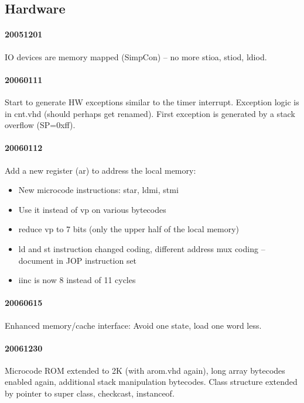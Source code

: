 \documentclass[a4paper,12pt]{scrartcl}
\newcommand{\code}[1]{{\textsf{#1}}}
\begin{document}
\subsection{Hardware}


\paragraph{20051201}

IO devices are memory mapped (SimpCon) -- no more stioa, stiod,
ldiod.


\paragraph{20060111}

Start to generate HW exceptions similar to the timer interrupt.
Exception logic is in \code{cnt.vhd} (should perhaps get renamed).
First exception is generated by a stack overflow (SP=0xff).

\paragraph{20060112}

Add a new register (\code{ar}) to address the local memory:

\begin{itemize}
    \item New microcode instructions: star, ldmi, stmi
    \item Use it instead of vp on various bytecodes
    \item reduce vp to 7 bits (only the upper half of the local
        memory)
    \item ld and st instruction changed coding, different address
        mux coding -- document in JOP instruction set
    \item iinc is now 8 instead of 11 cycles
\end{itemize}

\paragraph{20060615}

Enhanced memory/cache interface: Avoid one state, load one word less.

\paragraph{20061230}

Microcode ROM extended to 2K (with arom.vhd again), long array
bytecodes enabled again, additional stack manipulation bytecodes.
Class structure extended by pointer to super class, checkcast,
instanceof.
\end{document}
